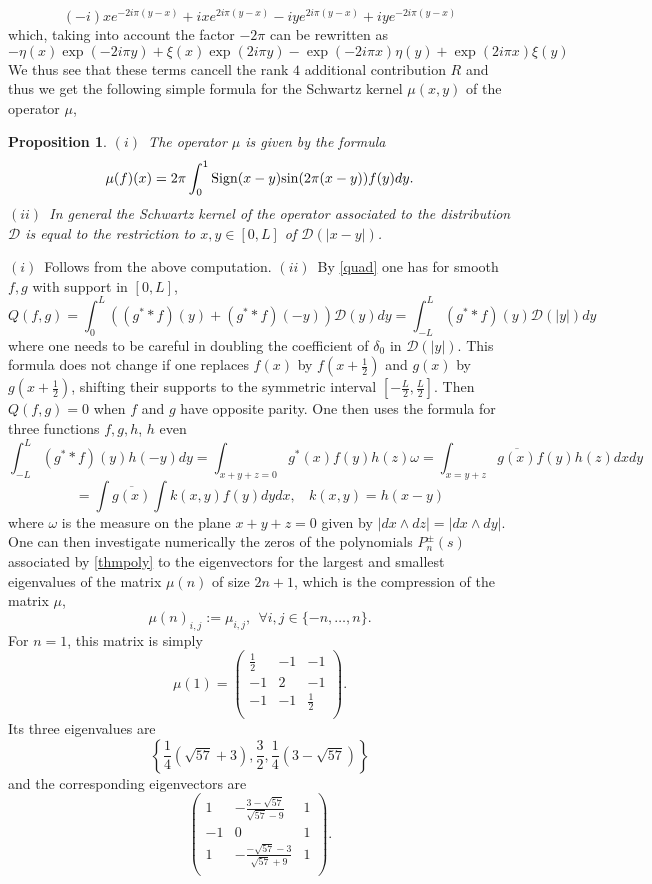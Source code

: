 \documentclass{amsart}
\newtheorem{prop}[thm]{Proposition}
\def\cD{{\mathcal D}}
\def\sin{{{\rm sin}}}
\def\cD{{\mathcal D}}
\def\sin{{{\rm sin}}}
\begin{document}
 $$
 (-i) x e^{-2 i \pi  (y-x)}+i x e^{2 i \pi  (y-x)}-i y e^{2 i \pi  (y-x)}+i y e^{-2 i \pi  (y-x)}
 $$
 which, taking into account the factor $-2 \pi$ can be rewritten as 
 $$
 -\eta(x)\exp(-2i \pi y)+\xi(x)\exp(2i \pi y)-\exp(-2i \pi x)\eta(y)+\exp(2i \pi x)\xi(y)
 $$
 We thus see that these terms cancell the rank $4$ additional contribution $R$ and thus we get the following simple formula for the Schwartz kernel $\mu(x,y)$ of the operator $\mu$,
 \begin{prop} $(i)$~The operator $\mu$ is given by the formula
 $$
 \mu(f)(x)=2 \pi\int_0^1 {\rm Sign}(x-y)\sin(2\pi(x-y))f(y)dy.
 $$
 $(ii)$~In general  the Schwartz kernel of the operator associated to the distribution $\cD$ is equal to the restriction to $x,y\in [0,L]$ of $\cD(\vert x-y\vert)$. 	
 \end{prop}
 \proof $(i)$~Follows from the above computation.\newline
 $(ii)$~By \eqref{quad} one has for smooth $f,g$ with support in $[0,L]$,
 $$
 Q(f,g)=\int_0^L \left((g^**f)(y)+(g^**f)(-y)\right)\cD(y)dy=\int_{-L}^L (g^**f)(y)\cD(\vert y\vert)dy $$
 where one needs to be careful in doubling the coefficient of $\delta_0$ in $\cD(\vert y\vert)$. This formula does not change if one replaces $f(x)$ by $f(x+\frac 12)$ and $g(x)$ by $g(x+\frac 12)$, shifting their supports to the symmetric interval $[-\frac L2,\frac L2]$. Then $Q(f,g)=0$ when $f$ and $g$ have opposite  parity.   One then uses the formula for three  functions $f,g,h$, $h$ even
 $$
 \int_{-L}^L (g^**f)(y)h(-y)dy=\int_{x+y+z=0}g^*(x)f(y)h(z)\omega =\int_{x=y+z}\overline{g(x)}f(y)h(z)dx dy$$
 $$ =\int\overline{g(x)}\int k(x,y)f(y) dy dx,\ \  \ \ k(x,y)=h(x-y)
 $$
where $\omega$ is the measure on the plane $x+y+z=0$ given by $\vert dx\wedge dz\vert=\vert dx\wedge dy\vert$.\endproof 
One can then investigate numerically the zeros of the polynomials  $P_n^\pm(s)$ associated by \eqref{thmpoly} to  the eigenvectors for the largest and smallest eigenvalues of the matrix $\mu(n)$ of size $2n+1$,  which is the compression of the matrix  $\mu$, 
$$
\mu(n)_{i,j}:=\mu_{i,j}, \ \ \forall i,j \in \{-n,\ldots , n\}.
$$
For $n=1$, this matrix is simply 
$$
\mu(1)=\left(
\begin{array}{ccc}
 \frac{1}{2} & -1 & -1 \\
 -1 & 2 & -1 \\
 -1 & -1 & \frac{1}{2} \\
\end{array}
\right).
$$
Its three eigenvalues are 
$$
\left\{\frac{1}{4} \left(\sqrt{57}+3\right),\frac{3}{2},\frac{1}{4} \left(3-\sqrt{57}\right)\right\}
$$
and the corresponding eigenvectors are 
$$
\left(
\begin{array}{ccc}
 1 & -\frac{3-\sqrt{57}}{\sqrt{57}-9} & 1 \\
 -1 & 0 & 1 \\
 1 & -\frac{-\sqrt{57}-3}{\sqrt{57}+9} & 1 \\
\end{array}
\right).
$$
\end{document}
